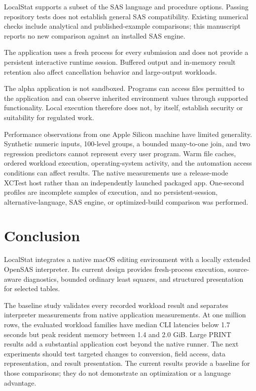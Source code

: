 \documentclass[11pt,a4paper]{article}
\begin{document}
LocalStat supports a subset of the SAS language and procedure
options. Passing repository tests does not establish general
SAS compatibility. Existing numerical checks include analytical
and published-example comparisons; this manuscript reports no
new comparison against an installed SAS engine.

The application uses a fresh process for every submission and
does not provide a persistent interactive runtime session.
Buffered output and in-memory result retention also affect
cancellation behavior and large-output workloads.

The alpha application is not sandboxed. Programs can access
files permitted to the application and can observe inherited
environment values through supported functionality. Local
execution therefore does not, by itself, establish security
or suitability for regulated work.

Performance observations from one Apple Silicon machine have
limited generality. Synthetic numeric inputs, 100-level groups,
a bounded many-to-one join, and two regression predictors cannot
represent every user program. Warm file caches, ordered workload
execution, operating-system activity, and the automation access
conditions can affect results. The native measurements use a
release-mode XCTest host rather than an independently launched
packaged app. One-second profiles are incomplete samples of
execution, and no persistent-session, alternative-language, SAS
engine, or optimized-build comparison was performed.

\section{Conclusion}

LocalStat integrates a native macOS editing environment with
a locally extended OpenSAS interpreter. Its current design
provides fresh-process execution, source-aware diagnostics,
bounded ordinary least squares, and structured presentation
for selected tables.

The baseline study validates every recorded workload result and
separates interpreter measurements from native application
measurements. At one million rows, the evaluated workload
families have median CLI latencies below 1.7 seconds but peak
resident memory between 1.4 and 2.0 GiB. Large PRINT results add a
substantial application cost beyond the native runner. The
next experiments should test targeted changes to conversion,
field access, data representation, and result presentation.
The current results provide a baseline for those comparisons;
they do not demonstrate an optimization or a language advantage.
\end{document}
